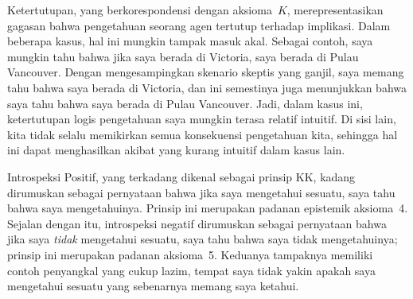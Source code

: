\documentclass[../../../include/open-logic-section]{subfiles}
\begin{document}
Ketertutupan, yang berkorespondensi dengan aksioma~$K$, merepresentasikan
gagasan bahwa pengetahuan seorang agen tertutup terhadap implikasi. Dalam
beberapa kasus, hal ini mungkin tampak masuk akal. Sebagai contoh, saya
mungkin tahu bahwa jika saya berada di Victoria, saya berada di Pulau
Vancouver. Dengan mengesampingkan skenario skeptis yang ganjil, saya memang
tahu bahwa saya berada di Victoria, dan ini semestinya juga menunjukkan
bahwa saya tahu bahwa saya berada di Pulau Vancouver. Jadi, dalam kasus ini,
ketertutupan logis pengetahuan saya mungkin terasa relatif intuitif. Di sisi
lain, kita tidak selalu memikirkan semua konsekuensi pengetahuan kita,
sehingga hal ini dapat menghasilkan akibat yang kurang intuitif dalam kasus
lain.

Introspeksi Positif, yang terkadang dikenal sebagai prinsip KK, kadang
dirumuskan sebagai pernyataan bahwa jika saya mengetahui sesuatu, saya tahu
bahwa saya mengetahuinya. Prinsip ini merupakan padanan epistemik aksioma~4.
Sejalan dengan itu, introspeksi negatif dirumuskan sebagai pernyataan bahwa
jika saya \emph{tidak} mengetahui sesuatu, saya tahu bahwa saya tidak
mengetahuinya; prinsip ini merupakan padanan aksioma~5. Keduanya tampaknya
memiliki contoh penyangkal yang cukup lazim, tempat saya tidak yakin apakah
saya mengetahui sesuatu yang sebenarnya memang saya ketahui.
\end{document}
